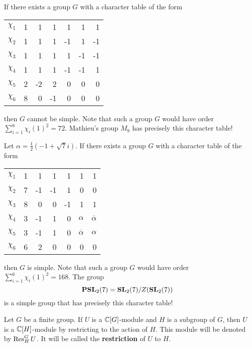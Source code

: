 \begin{example}
    If there exists a group $G$ with
    a character table 
    of the form
    \begin{center}
		\begin{tabular}{|c|rrrrrr|}
			\hline
			$\chi_{1}$ & 1 & 1 & 1 & 1 & 1 & 1\tabularnewline
			$\chi_{2}$ & 1 & 1 & 1 & -1 & 1 & -1 \tabularnewline
			$\chi_{3}$ & 1 & 1 & 1 & 1 & -1 & -1\tabularnewline
		    $\chi_{4}$ & 1 & 1 & 1 & -1 & -1 & 1\tabularnewline
			$\chi_{5}$ & 2 & -2 & 2 & 0 & 0 & 0\tabularnewline
			$\chi_{6}$ & 8 & 0 & -1 & 0 & 0 & 0\tabularnewline
			\hline
		\end{tabular}
	\end{center}
	then $G$ cannot be simple. Note that such a group $G$ would have order $\sum_{i=1}^6\chi_i(1)^2=72$. 
	Mathieu's group $M_{9}$ has precisely this character table! 
\end{example}

\begin{example}
    Let $\alpha=\frac{1}{2}(-1+\sqrt{7}i)$. 
    If there exists a group $G$ with a character table
    of the form
    \begin{center}
		\begin{tabular}{|c|rrrrrr|}
			\hline
			$\chi_{1}$ & 1 & 1 & 1 & 1 & 1 & 1\tabularnewline
			$\chi_{2}$ & 7 & -1 & -1 & 1 & 0 & 0 \tabularnewline
			$\chi_{3}$ & 8 & 0 & 0 & -1 & 1 & 1\tabularnewline
		    $\chi_{4}$ & 3 & -1 & 1 & 0 & $\alpha$ & $\overline{\alpha}$ \tabularnewline
			$\chi_{5}$ & 3 & -1 & 1 & 0 & $\overline{\alpha}$ & $\alpha$\tabularnewline
			$\chi_{6}$ & 6 & 2 & 0 & 0 & 0 & 0\tabularnewline
			\hline
		\end{tabular}
	\end{center}    
	then $G$ is simple. Note that such a group $G$ would have order 
	$\sum_{i=1}^6\chi_i(1)^2=168$. 
	The group  
	\[
	\mathbf{PSL}_2(7)=\mathbf{SL}_2(7)/Z(\mathbf{SL}_2(7))
	\]
	is a simple group that has precisely this character table!  
\end{example}


\begin{definition}
    Let $G$ be a finite group. 
    If $U$ is a $\mathbb{C}[G]$-module and $H$ is a subgroup of $G$, 
    then $U$ is a $\mathbb{C}[H]$-module by restricting to the action of $H$.  
    This module will be denoted by $\operatorname{Res}_H^GU$. It will be called
    the \textbf{restriction} of $U$ to $H$.
\end{definition}


